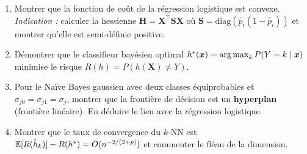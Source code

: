 \begin{exercice}
\begin{enumerate}
  \item Montrer que la fonction de co\^ut de la r\'egression logistique est convexe.
        \emph{Indication :} calculer la hessienne $\bm{H} = \bm{X}^\top \bm{S} \bm{X}$
        o\`u $\bm{S} = \text{diag}(\hat{p}_i(1-\hat{p}_i))$ et montrer qu'elle est
        semi-d\'efinie positive.
  \item D\'emontrer que le classifieur bay\'esien optimal $h^*(\bm{x}) = \operatorname*{arg\,max}_k P(Y=k \mid \bm{x})$
        minimise le risque $R(h) = P(h(\bm{X}) \neq Y)$.
  \item Pour le Na\"ive Bayes gaussien avec deux classes \'equiprobables et $\sigma_{j0} = \sigma_{j1} = \sigma_j$,
        montrer que la fronti\`ere de d\'ecision est un \textbf{hyperplan} (fronti\`ere lin\'eaire).
        En d\'eduire le lien avec la r\'egression logistique.
  \item Montrer que le taux de convergence du $k$-NN est
        $\mathbb{E}[R(\hat{h}_k)] - R(h^*) = O(n^{-2/(2+p)})$ et commenter le fl\'eau
        de la dimension.
\end{enumerate}
\end{exercice}
